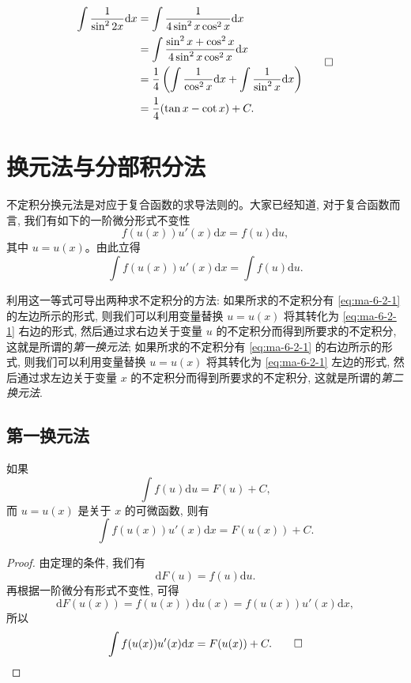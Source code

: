 \begin{solve}
\[
\begin{aligned}
  \int\frac1{\sin^22x}\mathrm dx
  &=
  \int\frac1{4\sin^2x\cos^2x}\mathrm dx\\
  &=
  \int\frac{\sin^2x+\cos^2x}{4\sin^2x\cos^2x}\mathrm dx\\
  &=
  \frac14\left(\int\frac1{\cos^2x}\mathrm dx+\int\frac1{\sin^2x}\mathrm dx\right)\\
  &=
  \frac14(\tan x-\cot x)+C.
\end{aligned}
\qedhere
\]
\end{solve}


\section{换元法与分部积分法}
\label{sec:ma-6-2}

不定积分换元法是对应于复合函数的求导法则的。大家已经知道, 对于复合函数而言, 我们有如下的一阶微分形式不变性
\[
  f(u(x))u'(x)\mathrm dx=f(u)\mathrm du,
\]
其中 $u=u(x)$。由此立得
\begin{equation}
  \int f(u(x))u'(x)\mathrm dx=\int f(u)\mathrm du.
  \label{eq:ma-6-2-1}
\end{equation}

利用这一等式可导出两种求不定积分的方法: 如果所求的不定积分有 \eqref{eq:ma-6-2-1} 的左边所示的形式, 则我们可以利用变量替换 $u=u(x)$ 将其转化为 \eqref{eq:ma-6-2-1} 右边的形式, 然后通过求右边关于变量 $u$ 的不定积分而得到所要求的不定积分, 这就是所谓的\emph{第一换元法}; 如果所求的不定积分有 \eqref{eq:ma-6-2-1} 的右边所示的形式, 则我们可以利用变量替换 $u=u(x)$ 将其转化为 \eqref{eq:ma-6-2-1} 左边的形式, 然后通过求左边关于变量 $x$ 的不定积分而得到所要求的不定积分, 这就是所谓的\emph{第二换元法}.

\subsection{第一换元法}
\label{subsec:ma-6-2-1}

\begin{theorem}\label{theorem:ma-6-2-1}
如果
\[
  \int f(u)\mathrm du=F(u)+C,
\]
而 $u=u(x)$ 是关于 $x$ 的可微函数, 则有
\[
  \int f(u(x))u'(x)\mathrm dx=F(u(x))+C.
\]
\end{theorem}


\begin{proof}
由定理的条件, 我们有
\[
  \mathrm dF(u)=f(u)\mathrm du.
\]
再根据一阶微分有形式不变性, 可得
\[
  \mathrm dF(u(x))=f(u(x))\mathrm du(x)=f(u(x))u'(x)\mathrm dx,
\]
所以
\[
  \int f(u(x))u'(x)\mathrm dx=F(u(x))+C.
\qedhere
\]
\end{proof}


